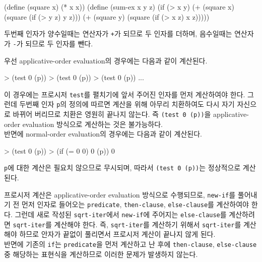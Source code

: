 \begin{lisp}
(define (square x) (* x x))
(define (sum-ex x y z)
  (if (> x y)
      (+ (square x) (square (if (> y z) y z)))
      (+ (square y) (square (if (> x z) x z)))))
\end{lisp}

두번째 인자가 양수일때는 연산자가 \texttt{+}가 되므로 두 인자를 더하며,
음수일때는 연산자가 \texttt{-}가 되므로 두 인자를 뺀다.

우선 applicative-order evaluation의 경우에는 다음과 같이 계산된다.
\begin{lisp}
> (test 0 (p))
> (test 0 (p))
> (test 0 (p))
  ...
\end{lisp}
이 경우에는 프로시저 \texttt{test}를 펼치기에 앞서 주어진 인자를 먼저 계산하여야
한다. 그런데 두번째 인자 \texttt{p}의 정의에 따르면 계산을 위해 아무리
치환하여도 다시 자기 자신으로 바뀌어 버리므로 치환은 영원히 끝나지 않는다. 즉
\texttt{(test 0 (p))}을 applicative-order evaluation 방식으로 계산하는 것은
불가능하다.\\

반면에 normal-order evaluation의 경우에는 다음과 같이 계산된다.
\begin{lisp}
> (test 0 (p))
> (if (= 0 0)
      0
      (p))
0
\end{lisp}
\texttt{p}에 대한 계산은 필요치 않으므로 무시되며, 따라서 \texttt{(test 0
  (p))}는 정상적으로 계산된다.


 프로시저 계산은 applicative-order evaluation 방식으로 수행되므로,
\texttt{new-if}를 풀어내기 전 먼저 인자로 들어오는 \texttt{predicate},
\texttt{then-clause}, \texttt{else-clause}를 계산하여야 한다. 그런데 새로
작성된 \texttt{sqrt-iter}에서 \texttt{new-if}에 주어지는
\texttt{else-clause}를 계산하려면 \texttt{sqrt-iter}를 계산해야 한다. 즉,
\texttt{sqrt-iter}를 계산하기 위해서 \texttt{sqrt-iter}를 계산해야 하므로
안자가 끝없이 풀리면서 프로시저 계산이 끝나지 않게 된다.\\

반면에 기존의 \texttt{if}는 \texttt{predicate}을 먼저 계산하고 난 후에
\texttt{then-clause}, \texttt{else-clause} 중 해당하는 표현식을 계산하므로
이러한 문제가 발생하지 않는다.

